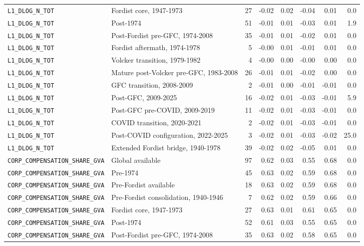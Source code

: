 \begin{landscape}
\begin{longtable}{p{4.4cm}p{3.8cm}rrrrrr}
\\
\nolinkurl{L1_DLOG_N_TOT} & Fordist core, 1947-1973 & 27 & -0.02 & 0.02 & -0.04 & 0.01 & 0.0
\\
\nolinkurl{L1_DLOG_N_TOT} & Post-1974 & 51 & -0.01 & 0.01 & -0.03 & 0.01 & 1.9
\\
\nolinkurl{L1_DLOG_N_TOT} & Post-Fordist pre-GFC, 1974-2008 & 35 & -0.01 & 0.01 & -0.02 & 0.01 & 0.0
\\
\nolinkurl{L1_DLOG_N_TOT} & Fordist aftermath, 1974-1978 & 5 & -0.00 & 0.01 & -0.01 & 0.01 & 0.0
\\
\nolinkurl{L1_DLOG_N_TOT} & Volcker transition, 1979-1982 & 4 & -0.00 & 0.00 & -0.00 & 0.00 & 0.0
\\
\nolinkurl{L1_DLOG_N_TOT} & Mature post-Volcker pre-GFC, 1983-2008 & 26 & -0.01 & 0.01 & -0.02 & 0.00 & 0.0
\\
\nolinkurl{L1_DLOG_N_TOT} & GFC transition, 2008-2009 & 2 & -0.01 & 0.00 & -0.01 & -0.01 & 0.0
\\
\nolinkurl{L1_DLOG_N_TOT} & Post-GFC, 2009-2025 & 16 & -0.02 & 0.01 & -0.03 & -0.01 & 5.9
\\
\nolinkurl{L1_DLOG_N_TOT} & Post-GFC pre-COVID, 2009-2019 & 11 & -0.02 & 0.01 & -0.03 & -0.01 & 0.0
\\
\nolinkurl{L1_DLOG_N_TOT} & COVID transition, 2020-2021 & 2 & -0.02 & 0.01 & -0.03 & -0.01 & 0.0
\\
\nolinkurl{L1_DLOG_N_TOT} & Post-COVID configuration, 2022-2025 & 3 & -0.02 & 0.01 & -0.03 & -0.02 & 25.0
\\
\nolinkurl{L1_DLOG_N_TOT} & Extended Fordist bridge, 1940-1978 & 39 & -0.02 & 0.02 & -0.05 & 0.01 & 0.0
\\
\nolinkurl{CORP_COMPENSATION_SHARE_GVA} & Global available & 97 & 0.62 & 0.03 & 0.55 & 0.68 & 0.0
\\
\nolinkurl{CORP_COMPENSATION_SHARE_GVA} & Pre-1974 & 45 & 0.63 & 0.02 & 0.59 & 0.68 & 0.0
\\
\nolinkurl{CORP_COMPENSATION_SHARE_GVA} & Pre-Fordist available & 18 & 0.63 & 0.02 & 0.59 & 0.68 & 0.0
\\
\nolinkurl{CORP_COMPENSATION_SHARE_GVA} & Pre-Fordist consolidation, 1940-1946 & 7 & 0.62 & 0.02 & 0.59 & 0.66 & 0.0
\\
\nolinkurl{CORP_COMPENSATION_SHARE_GVA} & Fordist core, 1947-1973 & 27 & 0.63 & 0.01 & 0.61 & 0.65 & 0.0
\\
\nolinkurl{CORP_COMPENSATION_SHARE_GVA} & Post-1974 & 52 & 0.61 & 0.03 & 0.55 & 0.65 & 0.0
\\
\nolinkurl{CORP_COMPENSATION_SHARE_GVA} & Post-Fordist pre-GFC, 1974-2008 & 35 & 0.63 & 0.02 & 0.58 & 0.65 & 0.0

\end{longtable}
\end{landscape}
